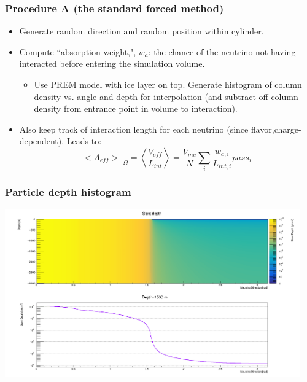 \documentclass[hyperref={pdfpagelabels=false},aspectratio=169]{beamer} \mode<presentation> { \usetheme{Boadilla} }
\begin{document}
\begin{frame}
\frametitle{Procedure A (the standard forced method)} 
\begin{itemize} 
\item Generate random direction and random position within cylinder. 
\item Compute ``absorption weight,", $w_a$: the chance of the neutrino not having interacted before entering the simulation volume. 
\begin{itemize} 
\item Use PREM model with ice layer on top. Generate histogram of column density vs. angle and depth for interpolation (and subtract off column density from entrance point in volume to interaction). 
\end{itemize} 
\item  Also keep track of interaction length for each neutrino (since flavor,charge-dependent). Leads to: 
\begin{equation}
  <A_{eff}>|_{\Omega}=  \left< \frac{V_{eff}}{L_{int}} \right>  = \frac{V_{mc}}{N} \sum_i \frac{w_{a,i}}{L_{int,i}} pass_i
\end{equation} 
\end{itemize} 
\end{frame}

\begin{frame}
\frametitle{Particle depth histogram} 
\centering
\includegraphics[width=5in]{slant_depth} 
\end{frame}
\end{document}
